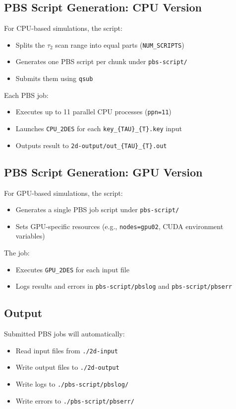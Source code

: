 \documentclass{article}
\begin{document}
\subsection*{PBS Script Generation: CPU Version}

For CPU-based simulations, the script:
\begin{itemize}
    \item Splits the \(\tau_2\) scan range into equal parts (\texttt{NUM\_SCRIPTS})
    \item Generates one PBS script per chunk under \texttt{pbs-script/}
    \item Submits them using \texttt{qsub}
\end{itemize}

Each PBS job:
\begin{itemize}
    \item Executes up to 11 parallel CPU processes (\texttt{ppn=11})
    \item Launches \texttt{CPU\_2DES} for each \texttt{key\_\{TAU\}\_\{T\}.key} input
    \item Outputs result to \texttt{2d-output/out\_\{TAU\}\_\{T\}.out}
\end{itemize}

\subsection*{PBS Script Generation: GPU Version}

For GPU-based simulations, the script:
\begin{itemize}
    \item Generates a single PBS job script under \texttt{pbs-script/}
    \item Sets GPU-specific resources (e.g., \texttt{nodes=gpu02}, CUDA environment variables)
\end{itemize}

The job:
\begin{itemize}
    \item Executes \texttt{GPU\_2DES} for each input file
    \item Logs results and errors in \texttt{pbs-script/pbslog} and \texttt{pbs-script/pbserr}
\end{itemize}

\subsection*{Output}

Submitted PBS jobs will automatically:
\begin{itemize}
    \item Read input files from \texttt{./2d-input}
    \item Write output files to \texttt{./2d-output}
    \item Write logs to \texttt{./pbs-script/pbslog/}
    \item Write errors to \texttt{./pbs-script/pbserr/}
\end{itemize}
\end{document}
